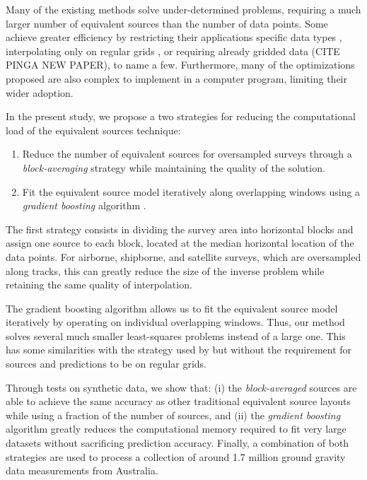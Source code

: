 \documentclass[twocolumn]{article}
\begin{document}
Many of the existing methods solve under-determined problems, requiring a much
larger number of equivalent sources than the number of data points.
Some achieve greater efficiency by restricting their applications
specific data types \citep{siqueira2017},
interpolating only on regular grids \citep{leao1989},
or requiring already gridded data (CITE PINGA NEW PAPER),
to name a few.
Furthermore, many of the optimizations proposed are also complex to implement
in a computer program, limiting their wider adoption.

In the present study,
we propose a two strategies for reducing the computational load of
the equivalent sources technique:

\begin{enumerate}
    \item Reduce the number of equivalent sources for oversampled surveys
      through a \emph{block-averaging} strategy while maintaining the quality
      of the solution.
    \item Fit the equivalent source model iteratively along overlapping windows
      using a \emph{gradient boosting} algorithm \citep{friedman2001}.
\end{enumerate}

The first strategy consists in dividing the survey area into horizontal blocks
and assign one source to each block, located at the median horizontal location
of the data points. For airborne, shipborne, and satellite surveys, which are
oversampled along tracks, this can greatly reduce the size of the inverse
problem while retaining the same quality of interpolation.

The gradient boosting algorithm allows us to fit the equivalent source model
iteratively by operating on individual overlapping windows.
Thus, our method solves several much smaller least-squares problems instead of
a large one.
This has some similarities with the strategy used by \citet{leao1989} but
without the requirement for sources and predictions to be on regular grids.

Through tests on synthetic data, we show that: (i) the \emph{block-averaged}
sources are able to achieve the same accuracy as other traditional equivalent
source layouts while using a fraction of the number of sources, and (ii) the
\emph{gradient boosting} algorithm greatly reduces the computational memory
required to fit very large datasets without sacrificing prediction accuracy.
Finally, a combination of both strategies are used to process a collection of
around 1.7 million ground gravity data measurements from Australia.
\end{document}
